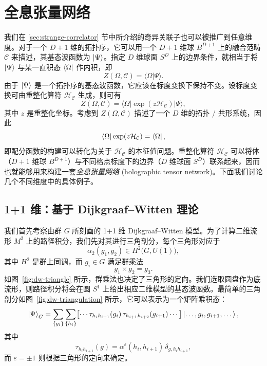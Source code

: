 \section{全息张量网络}
\label{sec:holographic-tensor-network}

我们在 \ref{sec:strange-correlator} 节中所介绍的奇异关联子也可以被推广到任意维度。对于一个 $D+1$ 维的拓扑序，它可以用一个 $D+1$ 维球 $B^{D+1}$ 上的融合范畴 $\mathcal{C}$ 来描述，其基态波函数为 $\ket{\Psi}$。指定 $D$ 维球面 $S^D$ 上的边界条件，就相当于将 $\ket{\Psi}$ 与某一直积态 $\bra{\Omega}$ 作内积，即
\begin{equation}
  Z(\Omega, \mathcal{C}) = \langle \Omega|\Psi \rangle.
\end{equation}
由于 $\ket{\Psi}$ 是一个拓扑序的基态波函数，它应该在标度变换下保持不变。设标度变换可由重整化算符 $\mathcal{H}_{\mathcal{C}}$ 生成，则可有
\begin{equation}
  Z(\Omega, \mathcal{C}) = \langle \Omega | \exp(z\mathcal{H}_{\mathcal{C}}) | \Psi \rangle,
\end{equation}
其中 $z$ 是重整化坐标。考虑到 $Z(\Omega, \mathcal{C})$ 描述了一个 $D$ 维的拓扑 / 共形系统，因此
\begin{equation}
  \bra{\Omega} \exp(z\mathcal{H}_{\mathcal{C}}) = \bra{\Omega},
  \label{eq:rg-operator}
\end{equation}
即配分函数的构建可以转化为关于 $\mathcal{H}_{\mathcal{C}}$ 的本征值问题。重整化算符 $\mathcal{H}_{\mathcal{C}}$ 可以将体（$D+1$ 维球 $B^{D+1}$）与不同格点标度下的边界（$D$ 维球面 $S^D$）联系起来，因而也就能够用来构建一套\emph{全息张量网络} (holographic tensor network)。下面我们讨论几个不同维度中的具体例子。

\subsection{1+1 维：基于 Dijkgraaf--Witten 理论}
\label{subsec:holographic-tensor-network-1+1d}

我们首先考察由群 $G$ 所刻画的 1+1 维 Dijkgraaf--Witten 模型\cite{dijkgraaf1990topological}。为了计算二维流形 $M^2$ 上的路径积分，我们先对其进行三角剖分，每个三角形对应于
\begin{equation}
  \alpha_2(g_1, g_2) \in H^2 \bigl( G, U(1) \bigr),
\end{equation}
其中 $H^2$ 是群上同调，而 $g_i\in G$ 满足群乘法
\begin{equation}
  g_1 \times g_2 = g_3.
\end{equation}
如图~\ref{fig:dw-triangle} 所示，群乘法也决定了三角形的定向。我们选取圆盘作为底流形，则路径积分将会在圆 $S^1$ 上给出相应二维模型的基态波函数。最简单的三角剖分如图~\ref{fig:dw-triangulation} 所示，它可以表示为一个矩阵乘积态：
\begin{equation}
    \ket{\Psi}_G
  = \sum_{\{g_i\}} \sum_{\{h_i\}}
    \bigl[ \cdots \tau_{h_i h_{i+1}}(g_i) \, \tau_{h_{i+1} h_{i+2}}(g_{i+1}) \cdots \bigr]
    \ket{\dots, g_i, g_{i+1}, \dots},
\end{equation}
其中
\begin{equation}
  \tau_{h_i h_{i+1}}(g) = \alpha^\varepsilon(h_i, h_{i+1}) \, \delta_{g, h_i h_{i+1}},
\end{equation}
而 $\varepsilon=\pm1$ 则根据三角形的定向来确定。

